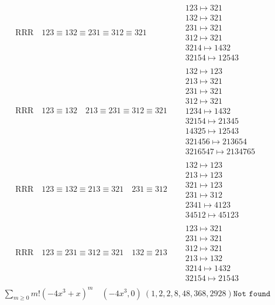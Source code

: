 \documentclass{article}
\begin{document}
\begin{align}
\\
\text{RRR}
\quad
123\equiv132\equiv231\equiv312\equiv321
\quad
&
\begin{matrix}
123 \mapsto 321
\\
132 \mapsto 321
\\
231 \mapsto 321
\\
312 \mapsto 321
\\
3214 \mapsto 1432
\\
32154 \mapsto 12543
\end{matrix}
\\
\text{RRR}
\quad
123\equiv132
\quad
213\equiv231\equiv312\equiv321
\quad
&
\begin{matrix}
132 \mapsto 123
\\
213 \mapsto 321
\\
231 \mapsto 321
\\
312 \mapsto 321
\\
1234 \mapsto 1432
\\
32154 \mapsto 21345
\\
14325 \mapsto 12543
\\
321456 \mapsto 213654
\\
3216547 \mapsto 2134765
\end{matrix}
\\
\text{RRR}
\quad
123\equiv132\equiv213\equiv321
\quad
231\equiv312
\quad
&
\begin{matrix}
132 \mapsto 123
\\
213 \mapsto 123
\\
321 \mapsto 123
\\
231 \mapsto 312
\\
2341 \mapsto 4123
\\
34512 \mapsto 45123
\end{matrix}
\\
\text{RRR}
\quad
123\equiv231\equiv312\equiv321
\quad
132\equiv213
\quad
&
\begin{matrix}
123 \mapsto 321
\\
231 \mapsto 321
\\
312 \mapsto 321
\\
213 \mapsto 132
\\
3214 \mapsto 1432
\\
32154 \mapsto 21543
\end{matrix}
\end{align}
$$
\begin{matrix}
\sum_{m \geq 0} m! \left(
-4 x^{3} + x
\right)^m
\quad
\left(-4 x^{3}, 0\right)
\ 
\left(1, 2, 2, 8, 48, 368, 2928\right)
\texttt{
Not found
}
\end{matrix}
$$
\end{document}
